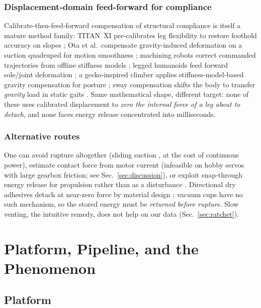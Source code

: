 \documentclass[journal]{IEEEtran}
\begin{document}
\subsubsection{Displacement-domain feed-forward for compliance}
Calibrate-then-feed-forward compensation of structural compliance is
itself a mature method family: TITAN~XI pre-calibrates leg flexibility to
restore foothold accuracy on slopes \cite{doi2005titan}; Ota et al.\
compensate gravity-induced deformation on a suction quadruped for motion
smoothness \cite{ota2006deformation}; machining robots correct commanded
trajectories from offline stiffness models \cite{wang2009machining,
klimchik2014compliance}; legged humanoids feed forward sole/joint
deformation \cite{takenaka2005floor}; a gecko-inspired climber applies
stiffness-model-based gravity compensation for posture
\cite{wang2024gecko}; sway compensation shifts the body to transfer
\emph{gravity} load in static gaits \cite{kurazume2002feedforward}. Same
mathematical shape, different target: none of these uses calibrated
displacement to \emph{zero the internal force of a leg about to
detach}, and none faces energy release concentrated into milliseconds.

\subsubsection{Alternative routes} One can avoid rupture altogether
(sliding suction \cite{yue2024snail}, at the cost of continuous power),
estimate contact force from motor current \cite{wahrburg2018motor}
(infeasible on hobby servos with large gearbox friction; see
Sec.~\ref{sec:discussion}), or exploit snap-through energy release for
propulsion rather than as a disturbance \cite{tang2020spine}. Directional
dry adhesives detach at near-zero force by material design
\cite{kim2008smooth, autumn2006frictional}; vacuum cups have no such
mechanism, so the stored energy must be \emph{returned before rupture}.
Slow venting, the intuitive remedy, does not help on our data
(Sec.~\ref{sec:ratchet}).

\section{Platform, Pipeline, and the Phenomenon}
\label{sec:phenomenon}

\subsection{Platform}
\label{sec:platform}
\end{document}
